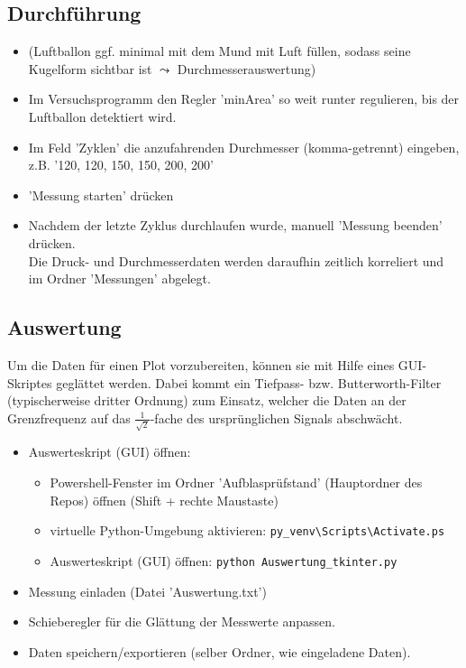 \documentclass[german, 11pt]{scrartcl}
\begin{document}
\subsection{Durchführung}
\begin{itemize}
    \item (Luftballon ggf. minimal mit dem Mund mit Luft füllen, sodass seine Kugelform sichtbar ist $\leadsto$ Durchmesserauswertung)
    \item Im Versuchsprogramm den Regler 'minArea' so weit runter regulieren, bis der Luftballon detektiert wird.
    \item Im Feld 'Zyklen' die anzufahrenden Durchmesser (komma-getrennt) eingeben, z.B. '120, 120, 150, 150, 200, 200'
    \item 'Messung starten' drücken
    \item Nachdem der letzte Zyklus durchlaufen wurde, manuell 'Messung beenden' drücken.\\
    Die Druck- und Durchmesserdaten werden daraufhin zeitlich korreliert und im Ordner 'Messungen' abgelegt.
\end{itemize}

\subsection{Auswertung}
Um die Daten für einen Plot vorzubereiten, können sie mit Hilfe eines GUI-Skriptes geglättet werden.
Dabei kommt ein Tiefpass- bzw. Butterworth-Filter (typischerweise dritter Ordnung) zum Einsatz,
welcher die Daten an der Grenzfrequenz auf das $\frac{1}{\sqrt{2}}$-fache des ursprünglichen Signals abschwächt.
\begin{itemize}
    \item Auswerteskript (GUI) öffnen:
    \begin{itemize}
        \item Powershell-Fenster im Ordner 'Aufblasprüfstand' (Hauptordner des Repos) öffnen (Shift + rechte Maustaste)
        \item virtuelle Python-Umgebung aktivieren: \texttt{py\_venv\textbackslash Scripts\textbackslash Activate.ps}
        \item Auswerteskript (GUI) öffnen: \texttt{python Auswertung\_tkinter.py}
    \end{itemize}
    \item Messung einladen (Datei 'Auswertung.txt')
    \item Schieberegler für die Glättung der Messwerte anpassen.
    \item Daten speichern/exportieren (selber Ordner, wie eingeladene Daten).
\end{itemize}
\end{document}
